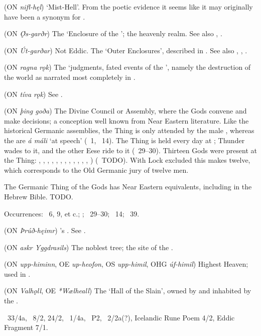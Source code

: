 \begin{itemize}
 (ON \emph{nifl-hęl})
  ‘Mist-Hell’. From the poetic evidence it seems like it may originally have been a synonym for .

 (ON \emph{Ǫ́s-garðr})
  The ‘Enclosure of the ’; the heavenly realm.  See also , .

 (ON \emph{Út-garðar})
  Not Eddic.  The ‘Outer Enclosures’, described in \Gylfaginning. See also , , .

 (ON \emph{ragna rǫk})
  The ‘judgments, fated events of the ’, namely the destruction of the world as narrated most completely in \Voluspa.

 (ON \emph{tíva rǫk})
  See .

 (ON \emph{þing goða})
  The Divine Council or Assembly, where the Gods convene and make decisions; a conception well known from Near Eastern literature.  Like the historical Germanic assemblies, the Thing is only attended by the male , whereas the  are \emph{á máli} ‘at speech’ (\Baldrsdraumar\ 1, \Thrymskvida\ 14).  The Thing is held every day at ; Thunder wades to it, and the other Eese ride to it (\Grimnismal\ 29–30).  Thirteen Gods were present at the Thing: , , , , , , , , , , , , ) (\Gylfaginning\ TODO).  With Lock excluded this makes twelve, which corresponds to the Old Germanic jury of twelve men.

  The Germanic Thing of the Gods has Near Eastern equivalents, including in the Hebrew Bible.  TODO.

  Occurrences: \Voluspa\ 6, 9, et c.; ; \Grimnismal\ 29–30; \Thrymskvida\ 14; \Hymiskvida\ 39.

 (ON \emph{Þrúð-hęimr})
  ’s .  See .

 (ON \emph{askr Yggdrasils})
  The noblest tree; the site of the .

 (ON \emph{upp-himinn}, OE \emph{up-heofon}, OS \emph{upp-himil}, OHG \emph{úf-himil})
  Highest Heaven; used in .

 (ON \emph{Valhǫll}, OE \emph{*Wælheall})
  The ‘Hall of the Slain’, owned by  and inhabited by the .

  \Voluspa\ 33/4a, \Grimnismal\ 8/2, 24/2, \Hyndluljod\ 1/4a, \HelgakvidaTwo\ P2, \Atlakvida\ 2/2a(?), Icelandic Rune Poem 4/2, Eddic Fragment 7/1.
\end{itemize}

